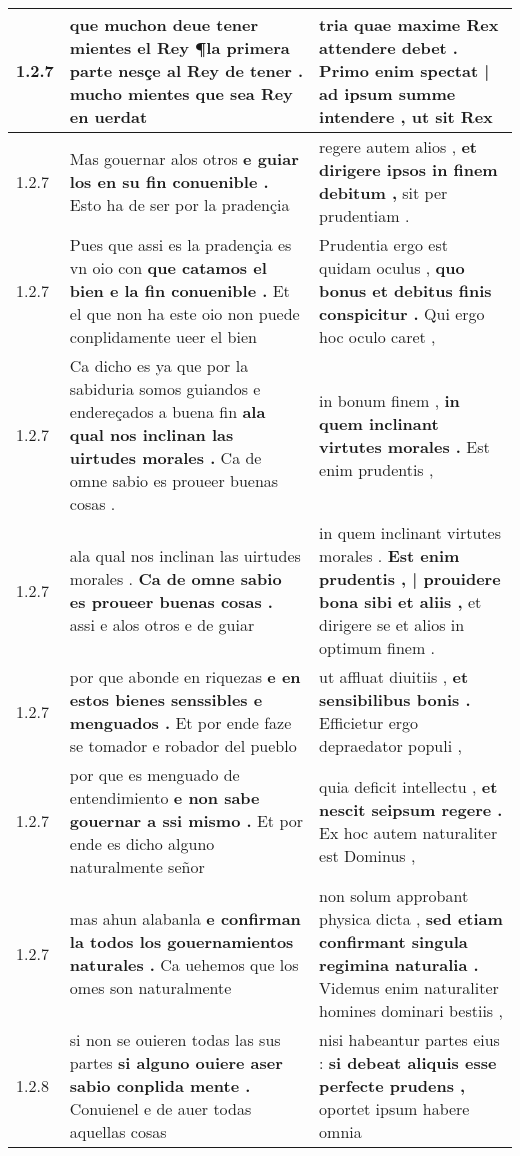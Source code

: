 \begin{tabular}{|p{1cm}|p{6.5cm}|p{6.5cm}|}
1.2.7 & que muchon deue tener mientes el Rey \textbf{ ¶la primera parte nesçe al Rey de tener . } mucho mientes que sea Rey en uerdat & tria quae maxime Rex attendere debet . \textbf{ Primo enim spectat | ad ipsum summe intendere , } ut sit Rex \\\hline
1.2.7 & Mas gouernar alos otros \textbf{ e guiar los en su fin conuenible . } Esto ha de ser por la pradençia & regere autem alios , \textbf{ et dirigere ipsos in finem debitum , } sit per prudentiam . \\\hline
1.2.7 & Pues que assi es la pradençia es vn oio con \textbf{ que catamos el bien e la fin conuenible . } Et el que non ha este oio non puede conplidamente ueer el bien & Prudentia ergo est quidam oculus , \textbf{ quo bonus et debitus finis conspicitur . } Qui ergo hoc oculo caret , \\\hline
1.2.7 & Ca dicho es ya que por la sabiduria somos guiandos e endereçados a buena fin \textbf{ ala qual nos inclinan las uirtudes morales . } Ca de omne sabio es proueer buenas cosas . & in bonum finem , \textbf{ in quem inclinant virtutes morales . } Est enim prudentis , \\\hline
1.2.7 & ala qual nos inclinan las uirtudes morales . \textbf{ Ca de omne sabio es proueer buenas cosas . } assi e alos otros e de guiar & in quem inclinant virtutes morales . \textbf{ Est enim prudentis , | prouidere bona sibi et aliis , } et dirigere se et alios in optimum finem . \\\hline
1.2.7 & por que abonde en riquezas \textbf{ e en estos bienes senssibles e menguados . } Et por ende faze se tomador e robador del pueblo & ut affluat diuitiis , \textbf{ et sensibilibus bonis . } Efficietur ergo depraedator populi , \\\hline
1.2.7 & por que es menguado de entendimiento \textbf{ e non sabe gouernar a ssi mismo . } Et por ende es dicho alguno naturalmente señor & quia deficit intellectu , \textbf{ et nescit seipsum regere . } Ex hoc autem naturaliter est Dominus , \\\hline
1.2.7 & mas ahun alabanla \textbf{ e confirman la todos los gouernamientos naturales . } Ca uehemos que los omes son naturalmente & non solum approbant physica dicta , \textbf{ sed etiam confirmant singula regimina naturalia . } Videmus enim naturaliter homines dominari bestiis , \\\hline
1.2.8 & si non se ouieren todas las sus partes \textbf{ si alguno ouiere aser sabio conplida mente . } Conuienel e de auer todas aquellas cosas & nisi habeantur partes eius : \textbf{ si debeat aliquis esse perfecte prudens , } oportet ipsum habere omnia \\\hline

\end{tabular}
